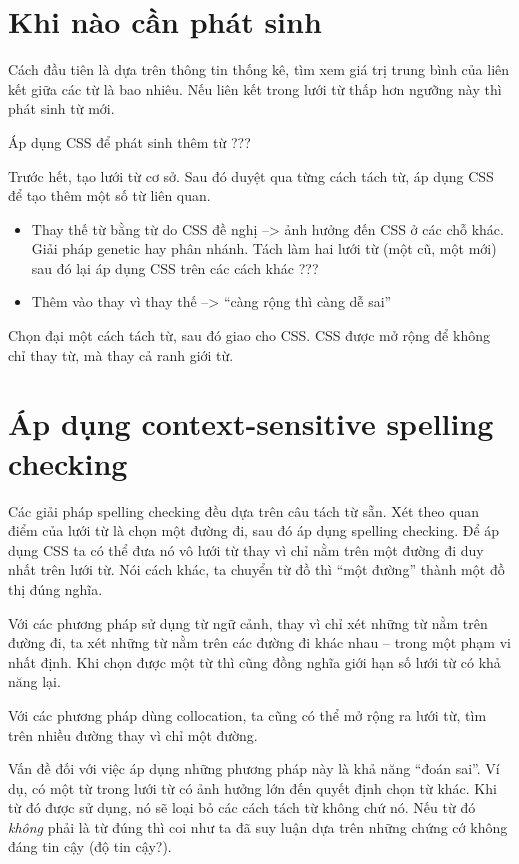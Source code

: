 \documentclass[a4paper,oneside,14pt]{extbook} %
\begin{document}
\section{Khi nào cần phát sinh}

Cách đầu tiên là dựa trên thông tin thống kê, tìm xem giá trị trung
bình của liên kết giữa các từ là bao nhiêu. Nếu liên kết trong lưới từ
thấp hơn ngưỡng này thì phát sinh từ mới.

Áp dụng CSS để phát sinh thêm từ ???

Trước hết, tạo lưới từ cơ sở. Sau đó duyệt qua từng cách tách từ, áp
dụng CSS để tạo thêm một số từ liên quan.
\begin{itemize}
\item Thay thế từ bằng từ do CSS đề nghị --> ảnh hưởng đến CSS ở các
  chỗ khác. Giải pháp genetic hay phân nhánh. Tách làm hai lưới từ
  (một cũ, một mới) sau đó lại áp dụng CSS trên các cách khác ???
\item Thêm vào thay vì thay thế --> ``càng rộng thì càng dễ sai''
\end{itemize}

Chọn đại một cách tách từ, sau đó giao cho CSS. CSS được mở rộng để không
chỉ thay từ, mà thay cả ranh giới từ.

\section{Áp dụng context-sensitive spelling checking}

Các giải pháp spelling checking đều dựa trên câu tách từ sẵn. Xét theo
quan điểm của lưới từ là chọn một đường đi, sau đó áp dụng spelling
checking. Để áp dụng CSS ta có thể đưa nó vô lưới từ thay vì chỉ nằm
trên một đường đi duy nhất trên lưới từ. Nói cách khác, ta chuyển từ
đồ thì ``một đường'' thành một đồ thị đúng nghĩa.

Với các phương pháp sử dụng từ ngữ cảnh, thay vì chỉ xét những từ nằm
trên đường đi, ta xét những từ nằm trên các đường đi khác nhau --
trong một phạm vi nhất định. Khi chọn được một từ thì cũng đồng nghĩa
giới hạn số lưới từ có khả năng lại.

Với các phương pháp dùng collocation, ta cũng có thể mở rộng ra lưới
từ, tìm trên nhiều đường thay vì chỉ một đường.

Vấn đề đối với việc áp dụng những phương pháp này là khả năng ``đoán
sai''. Ví dụ, có một từ trong lưới từ có ảnh hưởng lớn đến quyết định
chọn từ khác. Khi từ đó được sử dụng, nó sẽ loại bỏ các cách tách từ
không chứ nó. Nếu từ đó {\em không} phải là từ đúng thì coi như ta đã
suy luận dựa trên những chứng cớ không đáng tin cậy (độ tin cậy?).
\end{document}
